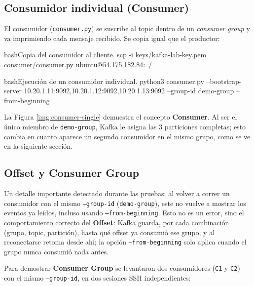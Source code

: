 	\subsection{Consumidor individual (Consumer)}

		El consumidor (\texttt{consumer.py}) se suscribe al topic dentro de un \textit{consumer group} y va imprimiendo cada mensaje recibido. Se copia igual que el productor:

		\begin{sourcecode}[\label{codigo-scp-consumer}]{bash}{Copia del consumidor al cliente.}
scp -i keys/kafka-lab-key.pem consumer/consumer.py ubuntu@54.175.182.84:~/
		\end{sourcecode}

		\begin{sourcecode}[\label{codigo-run-consumer}]{bash}{Ejecución de un consumidor individual.}
python3 consumer.py --bootstrap-server 10.20.1.11:9092,10.20.1.12:9092,10.20.1.13:9092 --group-id demo-group --from-beginning
		\end{sourcecode}


		La Figura \ref{img:consumer-single} demuestra el concepto \textbf{Consumer}. Al ser el único miembro de \texttt{demo-group}, Kafka le asigna las 3 particiones completas; esto cambia en cuanto aparece un segundo consumidor en el mismo grupo, como se ve en la siguiente sección.

	\subsection{Offset y Consumer Group}

		Un detalle importante detectado durante las pruebas: al volver a correr un consumidor con el mismo \texttt{--group-id} (\texttt{demo-group}), este no vuelve a mostrar los eventos ya leídos, incluso usando \texttt{--from-beginning}. Esto no es un error, sino el comportamiento correcto del \textbf{Offset}: Kafka guarda, por cada combinación (grupo, topic, partición), hasta qué offset ya consumió ese grupo, y al reconectarse retoma desde ahí; la opción \texttt{--from-beginning} solo aplica cuando el grupo nunca consumió nada antes.

		Para demostrar \textbf{Consumer Group} se levantaron dos consumidores (\texttt{C1} y \texttt{C2}) con el mismo \texttt{--group-id}, en dos sesiones SSH independientes:


